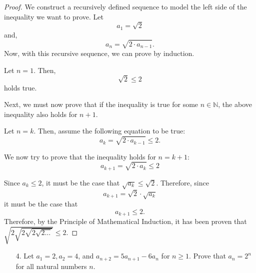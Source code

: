 \documentclass[10pt]{article}
\theoremstyle{definition}
\theoremstyle{plain}
\newcommand{\N}{\mathbb{N}}
\begin{document}
\setcounter{equation}{0}
\begin{proof}
  We construct a recursively defined sequence to model the left side of the inequality we want to prove. Let
    $$a_1 = \sqrt{2}$$ and,
    $$a_n = \sqrt{2\cdot a_{n-1}}.$$
    Now, with this recursive sequence, we can prove by induction.

  Let $n=1$. Then,
  \begin{equation}
    \sqrt{2} \leq 2
  \end{equation}
  holds true.

  \par Next, we must now prove that if the inequality is true for some $n\in\N$, the above inequality also holds for $n+1$.

  \par Let $n=k$. Then, assume the following equation to be true:
  \begin{equation}
    a_k = \sqrt{2\cdot a_{k-1}} \leq 2.
  \end{equation}

  \par We now try to prove that the inequality holds for $n=k+1$:
  \begin{equation}
    a_{k+1} = \sqrt{2\cdot a_{k}} \leq 2
  \end{equation}

  \par Since $a_k \leq 2$, it must be the case that $\sqrt{a_k} \leq \sqrt{2}.$ Therefore, since
  \begin{equation}
    a_{k+1} = \sqrt{2}\cdot \sqrt{a_{k}}
  \end{equation}
  it must be the case that
  \begin{equation}
    a_{k+1} \leq 2.
  \end{equation}
  Therefore, by the Principle of Mathematical Induction, it has been proven that $\sqrt{2\sqrt{2\sqrt{2\sqrt{2\dots}}}} \leq 2.$
\end{proof}



\pagebreak



\begin{enumerate}
  \item[4.] Let $a_1 = 2, a_2 = 4$, and $a_{n+2} = 5a_{n+1} - 6a_n$ for $n \geq 1$.  Prove that $a_n = 2^n$ for all natural numbers $n$.
\end{enumerate}
\end{document}
